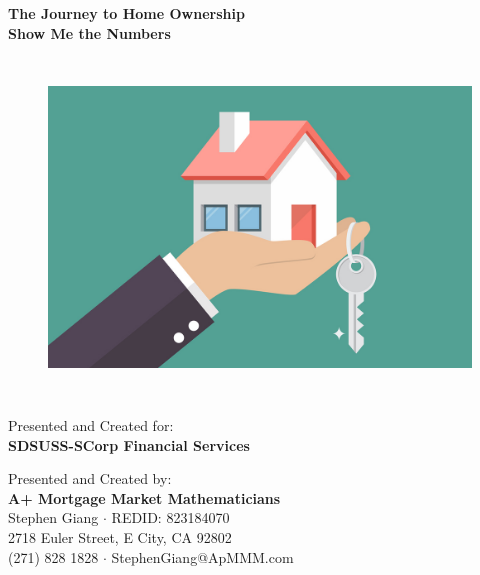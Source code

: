 \documentclass[12pt]{article}
\newcommand{\skipline}{\vspace{\baselineskip}}
\newenvironment{Section}[1]{}{\newpage}
\begin{document}
	
	\begin{Section}{Cover Page}
		\begin{center}
			\huge 
			\textbf{The Journey to Home Ownership \\
			Show Me the Numbers \\}
			\skipline
		\end{center}
		\begin{figure}[h!]
			\centering
			\includegraphics[width = \linewidth, height = 9cm]{Figures/CoverPhoto.jpg}
		\end{figure}
		\begin{center}
			\large
			Presented and Created for: \\
			\textbf{SDSUSS-SCorp Financial Services}
		\end{center}
		\skipline
		\begin{center}
			\large
			Presented and Created by: \\
			\textbf{A+ Mortgage Market Mathematicians} \\
			Stephen Giang $\cdot$ REDID: 823184070 \\
			2718 Euler Street, E City, CA 92802 \\
			(271) 828 1828 $\cdot$ StephenGiang@ApMMM.com
		\end{center}
	\end{Section}
\end{document}

